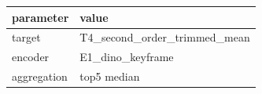 \begin{tabular}{ll}
\toprule
parameter & value \\
\midrule
target & T4_second_order_trimmed_mean \\
encoder & E1_dino_keyframe \\
aggregation & top5 median \\
\bottomrule
\end{tabular}
